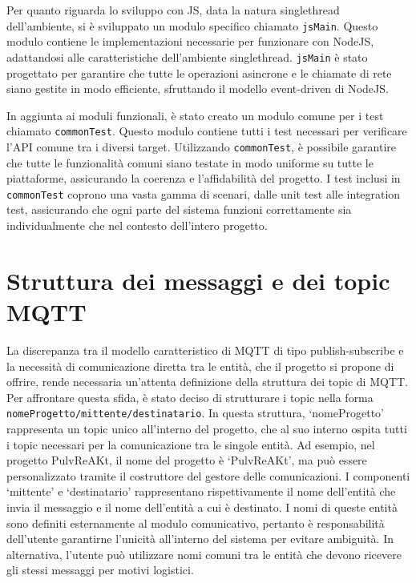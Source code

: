 \documentclass[12pt,a4paper,openright,twoside]{book}
\begin{document}
Per quanto riguarda lo sviluppo con \ac{JS}, data la natura singlethread dell'ambiente, si è sviluppato un modulo specifico chiamato \texttt{jsMain}. 
Questo modulo contiene le implementazioni necessarie per funzionare con NodeJS, adattandosi alle caratteristiche dell'ambiente singlethread. \texttt{jsMain} è stato progettato 
per garantire che tutte le operazioni asincrone e le chiamate di rete siano gestite in modo efficiente, sfruttando il modello event-driven di NodeJS.

In aggiunta ai moduli funzionali, è stato creato un modulo comune per i test chiamato \texttt{commonTest}. Questo modulo contiene tutti i test necessari per verificare 
l'API comune tra i diversi target. Utilizzando \texttt{commonTest}, è possibile garantire che tutte le funzionalità comuni siano testate in modo uniforme su tutte le piattaforme, 
assicurando la coerenza e l'affidabilità del progetto. I test inclusi in \texttt{commonTest} coprono una vasta gamma di scenari, dalle unit test alle integration test, assicurando che 
ogni parte del sistema funzioni correttamente sia individualmente che nel contesto dell'intero progetto.

\section{Struttura dei messaggi e dei topic MQTT}

La discrepanza tra il modello caratteristico di \ac{MQTT} di tipo publish-subscribe e la necessità di comunicazione diretta tra le entità, 
che il progetto si propone di offrire, rende necessaria un'attenta definizione della struttura dei topic di \ac{MQTT}. Per affrontare questa sfida, 
è stato deciso di strutturare i topic nella forma \texttt{nomeProgetto/mittente/destinatario}. In questa struttura, `nomeProgetto' rappresenta un topic 
unico all'interno del progetto, che al suo interno ospita tutti i topic necessari per la comunicazione tra le singole entità. Ad esempio, nel progetto PulvReAKt, 
il nome del progetto è `PulvReAKt', ma può essere personalizzato tramite il costruttore del gestore delle comunicazioni.
I componenti `mittente' e `destinatario' rappresentano rispettivamente il nome dell'entità che invia il messaggio e il nome dell'entità a cui è destinato. 
I nomi di queste entità sono definiti esternamente al modulo comunicativo, pertanto è responsabilità dell'utente garantirne l'unicità all'interno del sistema 
per evitare ambiguità. In alternativa, l'utente può utilizzare nomi comuni tra le entità che devono ricevere gli stessi messaggi per motivi logistici.
\end{document}
